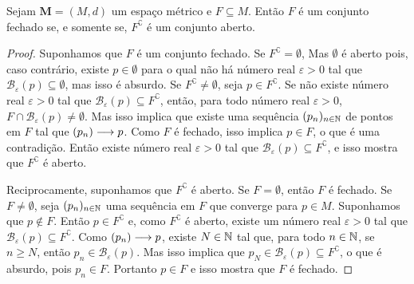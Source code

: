 \begin{prop}
	Sejam $\bm M = (M,d)$ um espaço métrico e $F \subseteq M$. Então $F$ é um conjunto fechado se, e somente se, $F^\complement$ é um conjunto aberto.
\end{prop}
\begin{proof}
	Suponhamos que $F$ é um conjunto fechado. Se $F^\complement = \emptyset$, Mas $\emptyset$ é aberto pois, caso contrário, existe $p \in \emptyset$ para o qual não há número real $\varepsilon > 0$ tal que $\mathcal B_\varepsilon(p) \subseteq \emptyset$, mas isso é absurdo. Se $F^\complement \neq \emptyset$, seja $p \in F^\complement$. Se não existe número real $\varepsilon > 0$ tal que $\mathcal B_\varepsilon(p) \subseteq F^\complement$, então, para todo número real $\varepsilon > 0$, $F \cap \mathcal B_\varepsilon(p) \neq \emptyset$. Mas isso implica que existe uma sequência $(p_n)_{n \in \mathbb{N}}$ de pontos em $F$ tal que $(p_n) \longrightarrow p$. Como $F$ é fechado, isso implica $p \in F$, o que é uma contradição. Então existe número real $\varepsilon > 0$ tal que $\mathcal B_\varepsilon(p) \subseteq F^\complement$, e isso mostra que $F^\complement$ é aberto.
	
	Reciprocamente, suponhamos que $F^\complement$ é aberto. Se $F = \emptyset$, então $F$ é fechado. Se $F \neq \emptyset$, seja $(p_n)_{n \in \mathbb{N}}$ uma sequência em $F$ que converge para $p \in M$. Suponhamos que $p \notin F$. Então $p \in F^\complement$ e, como $F^\complement$ é aberto, existe um número real $\varepsilon > 0$ tal que $\mathcal B_\varepsilon(p) \subseteq F^\complement$. Como $(p_n) \longrightarrow p$, existe $N \in \mathbb{N}$ tal que, para todo $n \in \mathbb{N}$, se $n \geq N$, então $p_n \in \mathcal B_\varepsilon(p)$. Mas isso implica que $p_{N} \in \mathcal B_\varepsilon(p) \subseteq F^\complement$, o que é absurdo, pois $p_n \in F$. Portanto $p \in F$ e isso mostra que $F$ é fechado.
\end{proof}

